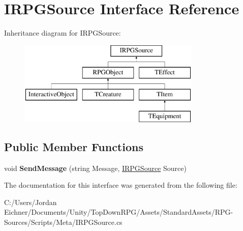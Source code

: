 \hypertarget{interface_i_r_p_g_source}{}\section{I\+R\+P\+G\+Source Interface Reference}
\label{interface_i_r_p_g_source}
Inheritance diagram for I\+R\+P\+G\+Source\+:\begin{figure}[H]
\begin{center}
\leavevmode
\includegraphics[height=4.000000cm]{interface_i_r_p_g_source}
\end{center}
\end{figure}
\subsection*{Public Member Functions}
\begin{DoxyCompactItemize}
\item 
\hypertarget{interface_i_r_p_g_source_a9d5a239ec9c77a2a462541257ab2dd08}{}void {\bfseries Send\+Message} (string Message, \hyperlink{interface_i_r_p_g_source}{I\+R\+P\+G\+Source} Source)\label{interface_i_r_p_g_source_a9d5a239ec9c77a2a462541257ab2dd08}

\end{DoxyCompactItemize}


The documentation for this interface was generated from the following file\+:\begin{DoxyCompactItemize}
\item 
C\+:/\+Users/\+Jordan Eichner/\+Documents/\+Unity/\+Top\+Down\+R\+P\+G/\+Assets/\+Standard\+Assets/\+R\+P\+G-\/\+Sources/\+Scripts/\+Meta/I\+R\+P\+G\+Source.\+cs\end{DoxyCompactItemize}
